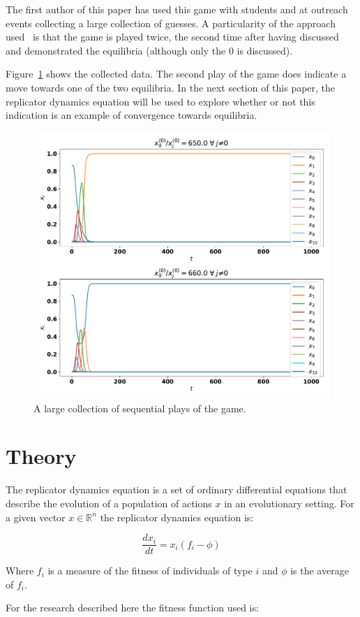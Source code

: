 \documentclass[a4paper]{article}
\begin{document}
The first author of this paper has used this game with students and at outreach
events collecting a large collection of guesses. A particularity of the approach
used~\cite{knight2015playing} is that the game is played twice, the second time
after having discussed and demonstrated the equilibria (although only the \(0\)
is discussed).

Figure~\ref{fig:history_of_play} shows the collected data. The second play of
the game does indicate a move towards one of the two equilibria.
In the next section of this paper, the replicator dynamics equation will be used
to explore whether or not this indication is an example of convergence towards
equilibria.

\begin{figure}[!hbtp]
    \centering
    \includegraphics[width=.5\textwidth]{../static/main.pdf}
    \caption{A large collection of sequential plays of the game.}
    \label{fig:history_of_play}
\end{figure}

\section{Theory}

The replicator dynamics equation is a set of ordinary differential equations
that describe the evolution of a population of actions \(x\) in an evolutionary
setting. For a given vector \(x\in\mathbb{R}^n\) the replicator dynamics
equation is:

\begin{equation}\label{eqn:replicator-dynamics-equation}
    \frac{dx_i}{dt} = x_i(f_i - \phi)
\end{equation}

Where \(f_i\) is a measure of the fitness of individuals of type \(i\) and
\(\phi\) is the average of \(f_i\).

For the research described here the fitness function used is:
\end{document}
